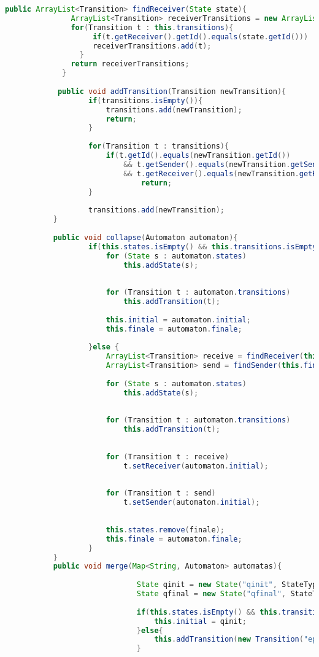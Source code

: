 \begin{lstlisting}[language=java, caption={példa unit teszteset.},captionpos=b]
			public ArrayList<Transition> findReceiver(State state){
			   ArrayList<Transition> receiverTransitions = new ArrayList<Transition>();
			   for(Transition t : this.transitions){
					if(t.getReceiver().getId().equals(state.getId()))
					receiverTransitions.add(t);
				 }
			   return receiverTransitions;
			 }
						 
			public void addTransition(Transition newTransition){
				   if(transitions.isEmpty()){
					   transitions.add(newTransition);
					   return;
				   }
						   
				   for(Transition t : transitions){
					   if(t.getId().equals(newTransition.getId()) 
						   && t.getSender().equals(newTransition.getSender()) 
						   && t.getReceiver().equals(newTransition.getReceiver()))
							   return;
				   }
						   
				   transitions.add(newTransition);
		   }
		   
		   public void collapse(Automaton automaton){
				   if(this.states.isEmpty() && this.transitions.isEmpty()){
					   for (State s : automaton.states)
						   this.addState(s);
					   
		   
					   for (Transition t : automaton.transitions)
						   this.addTransition(t);
						   
					   this.initial = automaton.initial;
					   this.finale = automaton.finale;
					   
				   }else {
					   ArrayList<Transition> receive = findReceiver(this.finale);
					   ArrayList<Transition> send = findSender(this.finale);
		   
					   for (State s : automaton.states) 
						   this.addState(s);
					   
		   
					   for (Transition t : automaton.transitions) 
						   this.addTransition(t);
					   
		   
					   for (Transition t : receive) 
						   t.setReceiver(automaton.initial);
					   
		   
					   for (Transition t : send) 
						   t.setSender(automaton.initial);
					   
		   
					   this.states.remove(finale);
					   this.finale = automaton.finale;
				   }
		   }
		   public void merge(Map<String, Automaton> automatas){
			  
							  State qinit = new State("qinit", StateType.NORMAL);
							  State qfinal = new State("qfinal", StateType.FINAL);
							  
							  if(this.states.isEmpty() && this.transitions.isEmpty()){
								  this.initial = qinit;
							  }else{
								  this.addTransition(new Transition("epsilon", this.finale, qinit));
							  }
					  

\end{lstlisting}
